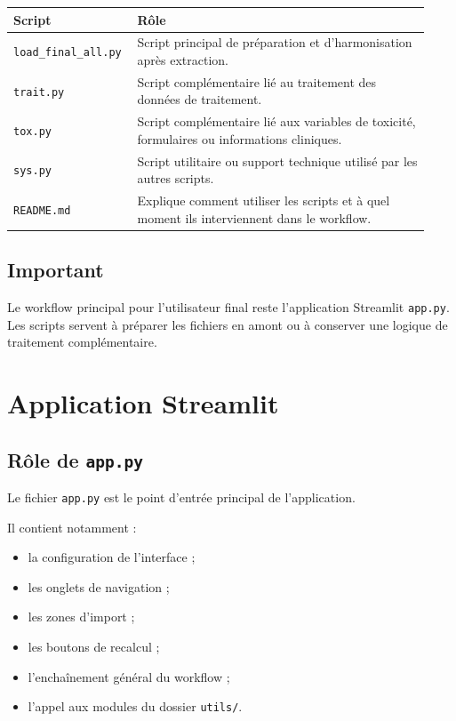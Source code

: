 \documentclass[11pt,a4paper]{article}
\newcommand{\code}[1]{\texttt{#1}}
\begin{document}
\begin{longtable}{p{0.25\linewidth} p{0.68\linewidth}}
\toprule
\textbf{Script} & \textbf{Rôle} \\
\midrule
\endhead

\code{load\_final\_all.py} &
Script principal de préparation et d'harmonisation après extraction. \\

\code{trait.py} &
Script complémentaire lié au traitement des données de traitement. \\

\code{tox.py} &
Script complémentaire lié aux variables de toxicité, formulaires ou informations cliniques. \\

\code{sys.py} &
Script utilitaire ou support technique utilisé par les autres scripts. \\

\code{README.md} &
Explique comment utiliser les scripts et à quel moment ils interviennent dans le workflow. \\

\bottomrule
\end{longtable}

\subsection*{Important}

Le workflow principal pour l'utilisateur final reste l'application Streamlit \code{app.py}. Les scripts servent à préparer les fichiers en amont ou à conserver une logique de traitement complémentaire.

\section{Application Streamlit}

\subsection{Rôle de \code{app.py}}

Le fichier \code{app.py} est le point d'entrée principal de l'application.

Il contient notamment :
\begin{itemize}
  \item la configuration de l'interface ;
  \item les onglets de navigation ;
  \item les zones d'import ;
  \item les boutons de recalcul ;
  \item l'enchaînement général du workflow ;
  \item l'appel aux modules du dossier \code{utils/}.
\end{itemize}
\end{document}

